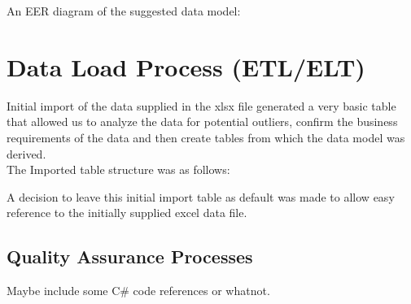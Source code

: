 \documentclass{article}
\begin{document}
    \newpage
    An EER diagram of the suggested data model:
    \begin{center}
    \end{center}




    \newpage
    \section{Data Load Process (ETL/ELT)}
        Initial import of the data supplied in the xlsx file generated a very basic table
        that allowed us to analyze the data for potential outliers, confirm the business
        requirements of the data and then create tables from which the data model was derived.
        \\
        The Imported table structure was as follows:
        \begin{center}
        \end{center}

        \noindent
        A decision to leave this initial import table as default
        was made to allow easy reference to the initially supplied
        excel data file.

        \newpage




        \subsection{Quality Assurance Processes}
        \label{sec:QAP}
            Maybe include some C\# code references or whatnot.
\end{document}
